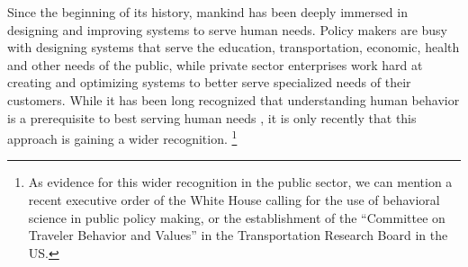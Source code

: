 Since the beginning of its history, mankind has been deeply immersed in 
	designing and improving systems to serve human needs.
Policy makers are busy with designing 
	systems that serve the education, transportation, economic, health and other 
	needs of the public,
while private sector enterprises work hard at creating 
	and optimizing systems to better serve  
	specialized needs of their customers.
While it has been long recognized that 
	understanding human behavior is a prerequisite 
	to best serving human needs \citep{Simon:1959kd},
	it is only recently that this approach is gaining a wider recognition.%
\footnote{
As evidence for this wider recognition in the public sector,
we can mention a recent executive order of the White House
calling for the use of behavioral science in public policy making, 
or the establishment of the ``Committee on Traveler Behavior and Values'' in the Transportation
Research Board in the US.}

